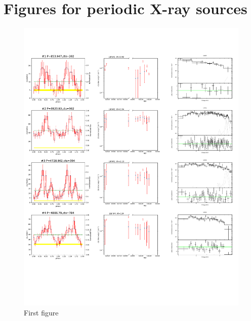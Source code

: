 \documentclass[twoside,twocolumn]{aastex63}
\begin{document}
\section{Figures for periodic X-ray sources}
\label{appen:fig}
\begin{figure}[htbp]
    \centering
    \includegraphics[page=1,scale=0.90,trim=5 50 0 20,clip]{plot_figure_LW.pdf}
    \caption{First figure \label{fig:Figure_p}}
  \end{figure}
  
\end{document}
